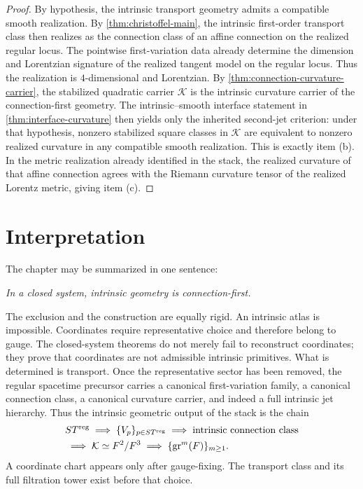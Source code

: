 \begin{proof}
	By hypothesis, the intrinsic transport geometry admits a compatible
	smooth realization.  By \cref{thm:christoffel-main}, the intrinsic
	first-order transport class then realizes as the connection class of
	an affine connection on the realized regular locus.
	The pointwise first-variation data already determine the dimension and
	Lorentzian signature of the realized tangent model on the regular
	locus.  Thus the realization is \(4\)-dimensional and Lorentzian.
	By \cref{thm:connection-curvature-carrier}, the stabilized quadratic
	carrier \(\mathcal K\) is the intrinsic curvature carrier of the
	connection-first geometry.  The intrinsic--smooth interface statement in
	\cref{thm:interface-curvature} then yields only the inherited
	second-jet criterion: under that hypothesis, nonzero stabilized
	square classes in \(\mathcal K\) are equivalent to nonzero realized
	curvature in any compatible smooth realization.  This is exactly item
	\textup{(b)}.
	In the metric realization already identified in the stack, the
	realized curvature of that affine connection agrees with the Riemann
	curvature tensor of the realized Lorentz metric, giving item
	\textup{(c)}.
\end{proof}
\section{Interpretation}
\label{sec:connection-interpretation}
The chapter may be summarized in one sentence:
\medskip
\centerline{\emph{In a closed system, intrinsic geometry is
		connection-first.}}
\medskip
The exclusion and the construction are equally rigid.
An intrinsic atlas is impossible.  Coordinates require representative
choice and therefore belong to gauge.  The closed-system theorems do not
merely fail to reconstruct coordinates; they prove that coordinates are
not admissible intrinsic primitives.
What is determined is transport.  Once the representative sector has been
removed, the regular spacetime precursor carries a canonical
first-variation family, a canonical connection class, a canonical
curvature carrier, and indeed a full intrinsic jet hierarchy.
Thus the intrinsic geometric output of the stack is the chain
\[
	\begin{aligned}
		 & ST^{\mathrm{reg}}
		\;\Longrightarrow\;
		\{V_p\}_{p\in ST^{\mathrm{reg}}}
		\;\Longrightarrow\;
		\text{intrinsic connection class}
		\\
		 & \;\Longrightarrow\;
		\mathcal K\simeq F^2/F^3
		\;\Longrightarrow\;
		\{\operatorname{gr}^m(F)\}_{m\ge 1}.
	\end{aligned}
\]
A coordinate chart appears only after gauge-fixing.  The transport class
and its full filtration tower exist before that choice.
